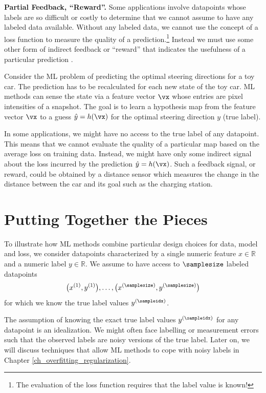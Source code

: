 \documentclass[12pt]{report}
\begin{document}
{\bf Partial Feedback, ``Reward''.}  
Some applications involve datapoints whose labels are so 
difficult or costly to determine that we cannot assume to 
have any labeled data available. Without any labeled data, 
we cannot use the concept of a loss function to measure the 
quality of a prediction.\footnote{The evaluation of the loss function 
requires that the label value is known!} Instead we must use 
some other form of indirect feedback or ``reward'' that indicates 
the usefulness of a particular prediction \cite{PredictionLearningGames,SuttonEd2}. 

Consider the ML problem of predicting the optimal steering 
directions for a toy car. The prediction has to be recalculated 
for each new state of the toy car. ML methods can sense the 
state via a feature vector $\vx$ whose entries are pixel intensities of a 
snapshot. The goal is to learn a hypothesis map from the feature vector 
$\vx$ to a guess $\hat{y} = h(\vx)$ for the optimal steering direction $y$ (true label). 

In some applications, we might have no access to the true label of any 
datapoint. This means that we cannot evaluate the quality of a particular 
map based on the average loss on training data. Instead, we might have 
only some indirect signal about the loss incurred by the prediction 
$\hat{y}=h(\vx)$. Such a feedback signal, or reward, could be obtained 
by a distance sensor which measures the change in the distance 
between the car and its goal such as the charging station. 

\section{Putting Together the Pieces} 
\label{sec_putting_togehter_the_pieces}

To illustrate how ML methods combine particular design choices for 
data, model and loss, we consider datapoints characterized by a single 
numeric feature $x \in \mathbb{R}$ and a numeric label $y \in \mathbb{R}$. 
We assume to have access to $\samplesize$ labeled datapoints 
\begin{equation} 
\big(x^{(1)},y^{(1)}\big),\ldots, \big(x^{(\samplesize)},y^{(\samplesize)}\big)  \label{equ_labeled_data_putting_together}
\end{equation} 
for which we know the true label values $y^{(\sampleidx)}$. 

The assumption of knowing the exact true label values $y^{(\sampleidx)}$ 
for any datapoint is an idealization. We might often face labelling 
or measurement errors such that the observed labels are noisy 
versions of the true label. Later on, we will discuss techniques that allow ML 
methods to cope with noisy labels in Chapter \ref{ch_overfitting_regularization}. 
\end{document}
